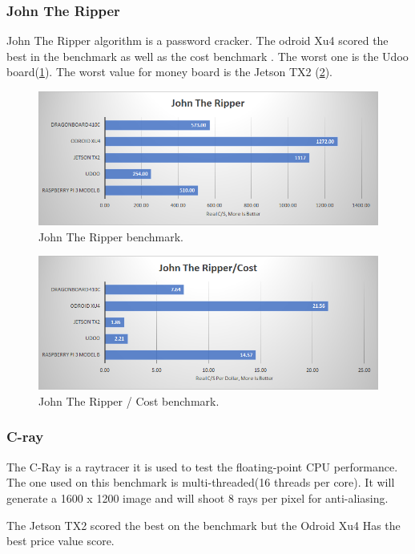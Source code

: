 \documentclass[english]{book_template} %
\begin{document}
\subsubsection{John The Ripper}
John The Ripper algorithm is a password cracker. The odroid Xu4 scored the best in the benchmark as well as the cost benchmark . 
The worst one is the Udoo board(\ref{fig:john}). The worst value for money board is the Jetson TX2 (\ref{fig:john_cost}).

\begin{figure}[H]
\center
\caption{John The Ripper benchmark.\label{fig:john}}
\includegraphics[scale=1]{./resultphoronix/john.png}
\end{figure} 

\begin{figure}[H]
\center
\caption{John The Ripper / Cost benchmark.\label{fig:john_cost}}
\includegraphics[scale=1]{./resultphoronix/john_cost.png}
\end{figure}

\subsubsection{C-ray}
The C-Ray is a raytracer it is used to test the floating-point CPU performance. The one used on this benchmark is multi-threaded(16 threads per core). It will generate a 1600 x 1200 image and will shoot 8 rays per pixel for anti-aliasing. \cite{OpenBenc27:onlineCRAY}

The Jetson TX2 scored the best on the benchmark but the Odroid Xu4 Has the best price value score.
\end{document}
